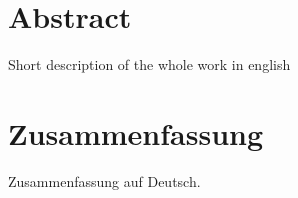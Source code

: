 

\chapter*{Abstract}
Short description of the whole work in english

\chapter*{Zusammenfassung}
Zusammenfassung auf Deutsch.